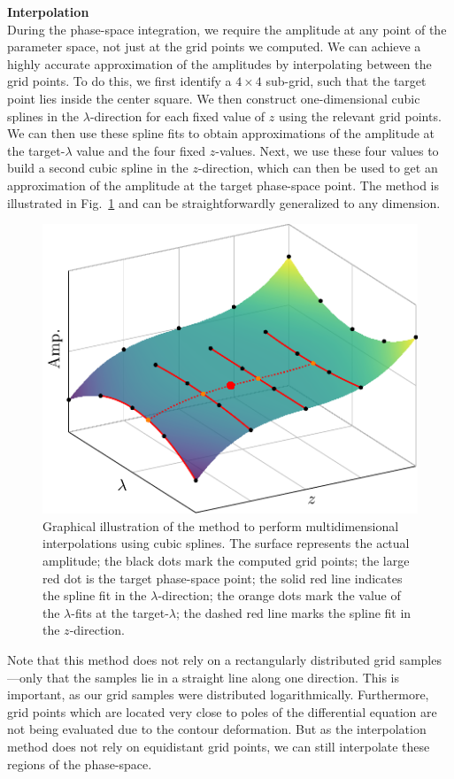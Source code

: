 \textbf{Interpolation}\\
During the phase-space integration, we require the amplitude at any point of the parameter space, not just at the grid points we computed. We can achieve a highly accurate approximation of the amplitudes by interpolating between the grid points. To do this, we first identify a $4\times 4$ sub-grid, such that the target point lies inside the center square. We then construct one-dimensional cubic splines in the $\lambda$-direction for each fixed value of $z$ using the relevant grid points. We can then use these spline fits to obtain approximations of the amplitude at the target-$\lambda$ value and the four fixed $z$-values. Next, we use these four values to build a second cubic spline in the $z$-direction, which can then be used to get an approximation of the amplitude at the target phase-space point. The method is illustrated in Fig.~\ref{fig:5:interpolation} and can be straightforwardly generalized to any dimension.
\begin{figure}[h]
\centering
\includegraphics[scale=0.6]{Images/interpolation.pdf}
\caption{Graphical illustration of the method to perform multidimensional interpolations using cubic splines. The surface represents the actual amplitude; the black dots mark the computed grid points; the large red dot is the target phase-space point; the solid red line indicates the spline fit in the $\lambda$-direction; the orange dots mark the value of the $\lambda$-fits at the target-$\lambda$; the dashed red line marks the spline fit in the $z$-direction.}
\label{fig:5:interpolation}
\end{figure}
Note that this method does not rely on a rectangularly distributed grid samples---only that the samples lie in a straight line along one direction. This is important, as our grid samples were distributed logarithmically. Furthermore, grid points which are located very close to poles of the differential equation are not being evaluated due to the contour deformation. But as the interpolation method does not rely on equidistant grid points, we can still interpolate these regions of the phase-space.

